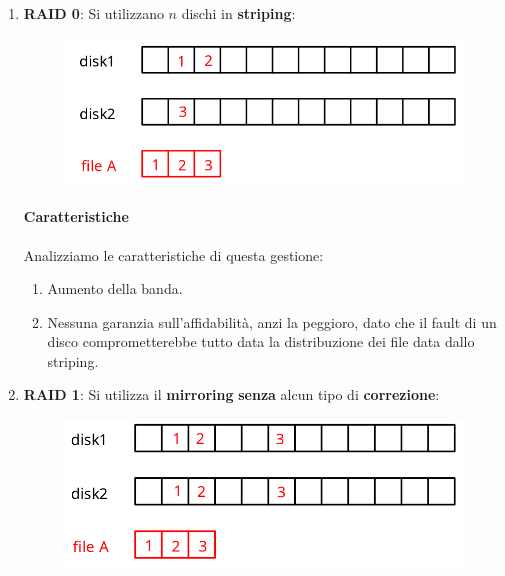 \documentclass{article}
\begin{document}
\begin{enumerate}
    \item \textbf{RAID 0}: Si utilizzano $n$ dischi in \textbf{striping}:
    \begin{figure}[htbp]
        \center
        \includegraphics[scale=0.3]{img/RAID0.png}
    \end{figure}
    \paragraph{Caratteristiche} Analizziamo le caratteristiche di questa gestione:
    \begin{enumerate}
        \item Aumento della banda.
        \item Nessuna garanzia sull'affidabilità, anzi la peggioro, dato che il fault di un disco comprometterebbe tutto data la distribuzione dei file data dallo striping.
    \end{enumerate}
    \vspace*{10px}
    \item \textbf{RAID 1}: Si utilizza il \textbf{mirroring} \textbf{senza} alcun tipo di \textbf{correzione}:
    \begin{figure}[htbp]
        \center
        \includegraphics[scale=0.3]{img/RAID1.png}
    \end{figure}

\newpage


\end{enumerate}
\end{document}
